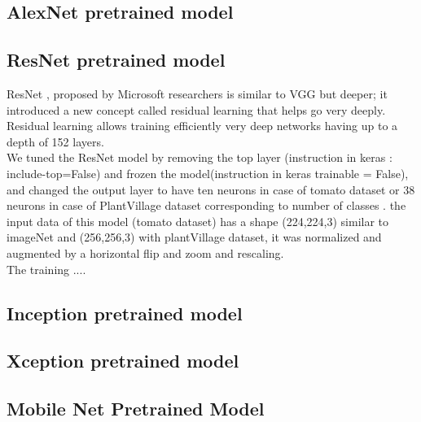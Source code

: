\subsection{AlexNet pretrained model}
\subsection{ResNet pretrained model}
ResNet \cite{art32}, proposed by Microsoft researchers is similar to VGG but deeper; it introduced a new concept
called residual learning that helps go very deeply. Residual learning allows training
efficiently very deep networks having up to a depth of 152 layers.\\

We tuned the ResNet model by removing the top layer (instruction in keras : include-top=False) and
frozen the model(instruction in keras trainable = False), and changed the output layer to have
ten neurons in case of tomato dataset or 38 neurons in case of PlantVillage dataset corresponding to number of classes . the input data of this model (tomato dataset) has a
shape (224,224,3) similar to imageNet and (256,256,3) with plantVillage dataset,
it was normalized and augmented by a horizontal flip and zoom and rescaling.\\

The training .... 
\subsection{Inception pretrained model}
\subsection{Xception pretrained model}
\subsection{Mobile Net Pretrained Model}














